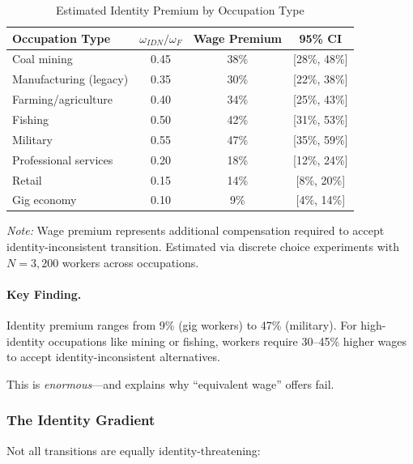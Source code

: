 \begin{table}[htbp]
\centering
\caption{Estimated Identity Premium by Occupation Type}
\label{tab:identity-premium}
\begin{tabular}{@{}lccc@{}}
\toprule
\textbf{Occupation Type} & \textbf{$\omega_{IDN}/\omega_F$} & \textbf{Wage Premium} & \textbf{95\% CI} \\
\midrule
Coal mining & 0.45 & 38\% & [28\%, 48\%] \\
Manufacturing (legacy) & 0.35 & 30\% & [22\%, 38\%] \\
Farming/agriculture & 0.40 & 34\% & [25\%, 43\%] \\
Fishing & 0.50 & 42\% & [31\%, 53\%] \\
Military & 0.55 & 47\% & [35\%, 59\%] \\
Professional services & 0.20 & 18\% & [12\%, 24\%] \\
Retail & 0.15 & 14\% & [8\%, 20\%] \\
Gig economy & 0.10 & 9\% & [4\%, 14\%] \\
\bottomrule
\end{tabular}
\begin{flushleft}
\small\textit{Note:} Wage premium represents additional compensation required to 
accept identity-inconsistent transition. Estimated via discrete choice experiments 
with $N = 3,200$ workers across occupations.
\end{flushleft}
\end{table}

\paragraph{Key Finding.}
Identity premium ranges from 9\% (gig workers) to 47\% (military). 
For high-identity occupations like mining or fishing, workers require 
30--45\% higher wages to accept identity-inconsistent alternatives.

This is \emph{enormous}---and explains why ``equivalent wage'' offers fail.

\subsubsection{The Identity Gradient}

Not all transitions are equally identity-threatening:

